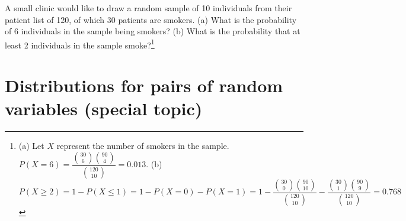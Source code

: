\begin{exercise}{A small clinic would like to draw a random sample of 10 individuals from their patient list of 120, of which 30 patients are smokers. (a) What is the probability of 6 individuals in the sample being smokers? (b) What is the probability that at least 2 individuals in the sample smoke?\footnote{(a) Let $X$ represent the number of smokers in the sample. $P(X = 6) = \dfrac{{30 \choose 6}{90 \choose 4}}{{120 \choose 10}} = 0.013$. (b) $P(X \geq 2) = 1 - P(X \leq 1) = 1 - P(X = 0) - P(X = 1) = 1 - \dfrac{{30 \choose 0}{90 \choose 10}}{{120 \choose 10}} - \dfrac{{30 \choose 1}{90 \choose 9}}{{120 \choose 10}} = 0.768$ }}
	
	
\end{exercise}



\section{Distributions for pairs of random variables (special topic)}
\label{correlatedRVs}


